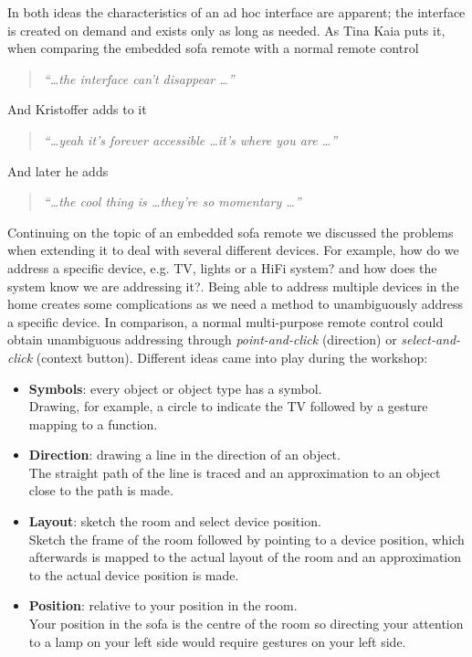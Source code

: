 In both ideas the characteristics of an ad hoc interface are apparent; the interface is created on demand and exists only as long as needed.
As Tina Kaia puts it, when comparing the embedded sofa remote with a normal remote control

\begin{quotation}
  \emph{``\dots the interface can't disappear \dots''}
\end{quotation}
And Kristoffer adds to it
\begin{quotation}
  \emph{``\dots yeah it's forever accessible \dots it's where you are \dots''}
\end{quotation}
And later he adds
\begin{quotation}
  \emph{``\dots the cool thing is \dots they're so momentary \dots''}
\end{quotation}

Continuing on the topic of an embedded sofa remote we discussed the problems when extending it to deal with several different devices.
For example, how do we address a specific device, e.g. TV, lights or a HiFi system? and how does the system know we are addressing it?.
\blank
Being able to address multiple devices in the home creates some complications as we need a method to unambiguously address a specific device.
In comparison, a normal multi-purpose remote control could obtain unambiguous addressing through \emph{point-and-click} (direction) or \emph{select-and-click} (context button).
Different ideas came into play during the workshop: 

\begin{itemize}
  \item{\textbf{Symbols}: every object or object type has a symbol.\\
        Drawing, for example, a circle to indicate the TV followed by a gesture mapping to a function.
  }
  \item{\textbf{Direction}: drawing a line in the direction of an object.\\
        The straight path of the line is traced and an approximation to an object close to the path is made.
  }
  \item{\textbf{Layout}: sketch the room and select device position.\\
        Sketch the frame of the room followed by pointing to a device position, which afterwards is mapped to the actual layout of the room and an approximation to the actual device position is made.
  }
  \item{\textbf{Position}: relative to your position in the room.\\
        Your position in the sofa is the centre of the room so directing your attention to a lamp on your left side would require gestures on your left side.
  }
\end{itemize}

